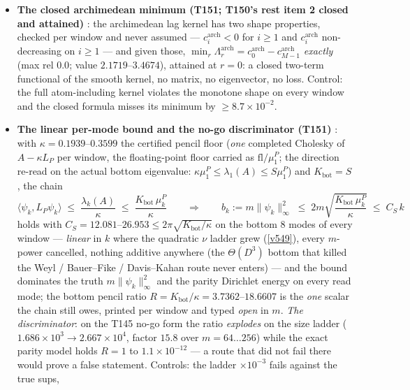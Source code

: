 \documentclass[11pt,a4paper]{article}
\begin{document}
\begin{itemize}[leftmargin=1.5em]
$5.1\times10^{-8}$ at $m=2001$ --- the honest, $m$-free cost of leaving the $\ell^2$ world.
Controls: dropping the boundary term breaks the identity ($4.8\times10^{-2}$), the Neumann
energy undercounts a first-node vector by $0.50$.
\item \textbf{The closed archimedean minimum (T151; T150's rest item 2 closed and attained)}
\mE: the archimedean lag kernel has two shape properties, checked per window and never
assumed --- $c^{\mathrm{arch}}_i<0$ for $i\ge1$ and $c^{\mathrm{arch}}_i$ non-decreasing on
$i\ge1$ --- and given those,
$\min_r\Lambda^{\mathrm{arch}}_r=c^{\mathrm{arch}}_0-c^{\mathrm{arch}}_{M-1}$ \emph{exactly}
(max rel $0.0$; value $2.1719$--$3.4674$), attained at $r=0$: a closed two-term functional of
the smooth kernel, no matrix, no eigenvector, no loss. Control: the full atom-including
kernel violates the monotone shape on every window and the closed formula misses its minimum
by $\ge8.7\times10^{-2}$.
\item \textbf{The linear per-mode bound and the no-go discriminator (T151)} \mE: with
$\kappa=0.1939$--$0.3599$ the certified pencil floor (\emph{one} completed Cholesky of
$A-\kappa L_P$ per window, the floating-point floor carried as $\mathrm{fl}/\mu^P_1$; the
direction re-read on the actual bottom eigenvalue:
$\kappa\mu^P_1\le\lambda_1(A)\le S\mu^P_1$) and $K_{\mathrm{bot}}=S$, the chain
\[
\langle\psi_k,L_P\psi_k\rangle\;\le\;\frac{\lambda_k(A)}{\kappa}
\;\le\;\frac{K_{\mathrm{bot}}\,\mu^P_k}{\kappa}
\qquad\Longrightarrow\qquad
b_k:=m\|\psi_k\|_\infty^2\;\le\;2m\sqrt{\frac{K_{\mathrm{bot}}\,\mu^P_k}{\kappa}}
\;\le\;C_S\,k
\]
holds with $C_S=12.081$--$26.953\le2\pi\sqrt{K_{\mathrm{bot}}/\kappa}$ on the bottom $8$
modes of every window --- \emph{linear} in $k$ where the quadratic $\nu$ ladder grew
(\vref{v549}), every $m$-power cancelled, nothing additive anywhere (the $\Theta(D^3)$ bottom
that killed the Weyl / Bauer--Fike / Davis--Kahan route never enters) --- and the bound
dominates the truth $m\|\psi_k\|_\infty^2$ and the parity Dirichlet energy on every read
mode; the bottom pencil ratio $R=K_{\mathrm{bot}}/\kappa=3.7362$--$18.6607$ is the \emph{one}
scalar the chain still owes, printed per window and typed \emph{open} in $m$. \emph{The
discriminator}: on the T145 no-go form the ratio \emph{explodes} on the size ladder
($1.686\times10^{3}\to2.667\times10^{4}$, factor $15.8$ over $m=64\ldots256$) while the exact
parity model holds $R=1$ to $1.1\times10^{-12}$ --- a route that did not fail there would
prove a false statement. Controls: the ladder $\times10^{-3}$ fails against the true sups,

\end{itemize}
\end{document}
